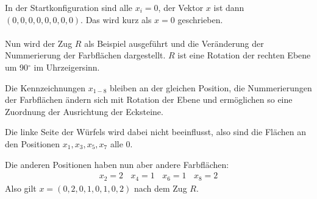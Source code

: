 \documentclass[12pt,a4paper, usenames, dvipsnames]{article}
\begin{document}
In der Startkonfiguration sind alle $x_i = 0$, der Vektor $x$ ist dann $(0, 0, 0, 0, 0, 0, 0, 0)$. Das wird kurz als $x=0$ geschrieben.\\
\\
Nun wird der Zug $R$ als Beispiel ausgeführt und die Veränderung der Nummerierung der Farbflächen dargestellt. $R$ ist eine Rotation der rechten Ebene um 90$^\circ$ im Uhrzeigersinn. 

Die Kennzeichnungen $x_{1-8}$ bleiben an der gleichen Position, die Nummerierungen  der Farbflächen ändern sich mit Rotation der Ebene und ermöglichen so eine Zuordnung der Ausrichtung der Ecksteine. 

Die linke Seite der Würfels wird dabei nicht beeinflusst, also sind die Flächen an den Positionen $x_1, x_3, x_5, x_7$ alle 0. 

Die anderen Positionen haben nun aber andere Farbflächen: 
\begin{align*}
x_2 = 2 \ \ \ \ x_4 = 1 \ \ \ \ x_6 = 1 \ \ \ \ x_8 = 2  
\end{align*}
Also gilt $x = (0, 2, 0, 1, 0, 1, 0, 2)$ nach dem Zug $R$. 
\end{document}
